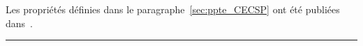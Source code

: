 \begin{center}
\begin{minipage}{\textwidth}
{    Les propriétés définies dans le paragraphe~\ref{sec:ppte_CECSP}
    ont été publiées
    dans~\cite{Nattaf_ORSpectrum,Nattaf_Constraints,Nattaf_CPDP}.} 
    \vspace{0.5cm}
    \hrule
  \end{minipage}
\end{center}


